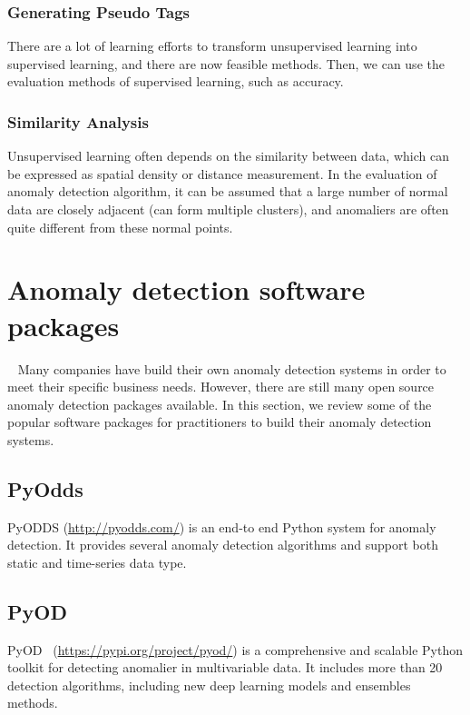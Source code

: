 \subsubsection{Generating Pseudo Tags}

There are a lot of learning efforts to transform
unsupervised learning into supervised learning,
and there are now feasible methods.
Then,
we can use the evaluation methods of supervised learning,
such as accuracy.

\subsubsection{Similarity Analysis}

Unsupervised learning often depends
on the similarity between data,
which can be expressed as spatial density
or distance measurement.
In the evaluation of anomaly detection algorithm,
it can be assumed that a large number of normal
data are closely adjacent (can form multiple clusters),
and anomaliers are often quite different from these normal points.

\section{Anomaly detection software packages}~\label{sec:tools}
Many companies have build
their own anomaly detection systems in order to
meet their specific business needs.
However,
there are still many open source anomaly detection packages available.
In this section,
we review some of the popular software packages for
practitioners to build their anomaly detection systems.

\subsection{PyOdds}

PyODDS (\href{http://pyodds.com/}{http://pyodds.com/}) 
is an end-to end Python system for
anomaly detection.
It provides several anomaly detection algorithms and
support both static and time-series data type.

\subsection{PyOD}
PyOD~\cite{zhao2019pyod} (\href{https://pypi.org/project/pyod/}{https://pypi.org/project/pyod/})
is a comprehensive and scalable Python toolkit for
detecting anomalier in multivariable data.
It includes more than 20 detection algorithms,
including new deep learning models and ensembles methods.

